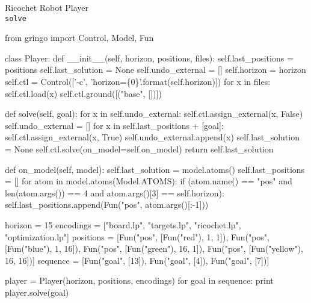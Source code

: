 \begin{frame}[fragile]{Ricochet Robot Player\\[-5pt]\large\texttt{solve}}
\Tiny\vspace{-15pt}
\begin{semiverbatim}
from gringo import Control, Model, Fun

class Player:
    def __init__(self, horizon, positions, files):
        self.last_positions = positions
        self.last_solution = None
        self.undo_external = []
        self.horizon = horizon
        self.ctl = Control(['-c', 'horizon=\{0\}'.format(self.horizon)])
        for x in files:
            self.ctl.load(x)
        self.ctl.ground([("base", [])])

\alert{    def solve(self, goal):
        for x in self.undo_external:
            self.ctl.assign_external(x, False)
        self.undo_external = []
        for x in self.last_positions + [goal]:
            self.ctl.assign_external(x, True)
            self.undo_external.append(x)
        self.last_solution = None
        self.ctl.solve(on_model=self.on_model)
        return self.last_solution}

    def on_model(self, model):
        self.last_solution = model.atoms()
        self.last_positions = []
        for atom in model.atoms(Model.ATOMS):
            if (atom.name() == "pos" and len(atom.args()) == 4 and atom.args()[3] == self.horizon):
                self.last_positions.append(Fun("pos", atom.args()[:-1]))

horizon   = 15
encodings = ["board.lp", "targets.lp", "ricochet.lp", "optimization.lp"]
positions = [Fun("pos", [Fun("red"),     1,  1]), Fun("pos", [Fun("blue"),    1, 16]),
             Fun("pos", [Fun("green"),  16,  1]), Fun("pos", [Fun("yellow"), 16, 16])]
sequence  = [Fun("goal", [13]), Fun("goal", [4]), Fun("goal", [7])]

player = Player(horizon, positions, encodings)
for goal in sequence:
    print player.solve(goal)
\end{semiverbatim}
\end{frame}
